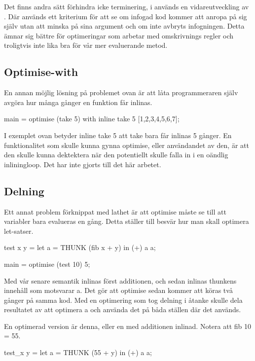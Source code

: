 \documentclass[Rapport]{subfiles}
\begin{document}
Det finns andra sätt förhindra icke terminering, i \cite{mitchell2007supercompiler} 
används en vidareutveckling av \cite{home-emb}. Där används ett kriterium för att se om infogad kod kommer att anropa på sig själv utan att minska på sina argument och om inte avbryts infogningen. Detta ämnar sig bättre för optimeringar som arbetar med omskrivnings regler och troligtvis inte lika bra för vår mer evaluerande metod.



\subsection{Optimise-with}
En annan möjlig lösning på problemet ovan är att låta programmeraren själv avgöra hur
många gånger en funktion får inlinas.

\begin{codeEx}
main = optimise (take 5) with { inline take 5 } [1,2,3,4,5,6,7];
\end{codeEx}

I exemplet ovan betyder inline take 5 att take bara får inlinas 5 gånger.
En funktionalitet som skulle kunna gynna optimise, eller användandet av den,
är att den skulle kunna dektektera när den potentiellt skulle falla in i en
oändlig inliningloop. Det har inte gjorts till det här arbetet.

\subsection{Delning}
Ett annat problem förknippat med lathet är att optimise måste se till att variabler bara 
evalueras en gång. Detta ställer till besvär hur man skall optimera let-satser.

\begin{codeEx}
test x y = let
    { a = THUNK (fib x + y)
    } in (+) a a;

main = optimise (test 10) 5;
\end{codeEx}

Med vår senare semantik inlinas först additionen, och sedan inlinas thunkens innehåll
som motsvarar a. Det gör att optimise sedan kommer att
köras två gånger på samma kod. Med en optimering som tog delning i åtanke 
skulle dela resultatet av att optimera a och använda det på båda ställen där det används.

En optimerad version är denna, eller en med additionen inlinad. Notera att fib 10 = 55.

\begin{codeEx}
test_x y = let
    { a = THUNK (55 + y)
    } in (+) a a;
\end{codeEx}
\end{document}
